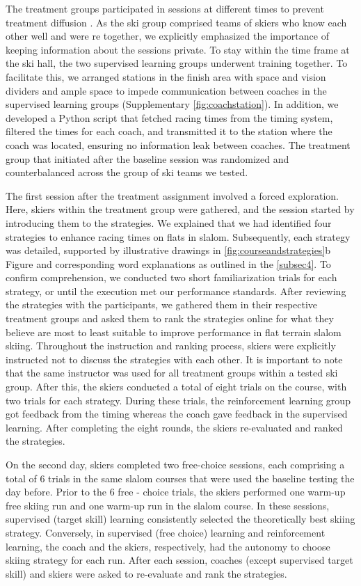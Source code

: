 \documentclass[pdflatex,sn-mathphys-num]{sn-jnl}%
\theoremstyle{thmstyleone}%
\theoremstyle{thmstyletwo}%
\theoremstyle{thmstylethree}%
\begin{document}
The treatment groups participated in sessions at different times to prevent treatment diffusion \cite{maxwell_designing_2017}. As the ski group comprised teams of skiers who know each other well and were re together, we explicitly emphasized the importance of keeping information about the sessions private. To stay within the time frame at the ski hall, the two supervised learning groups underwent training together. To facilitate this, we arranged stations in the finish area with space and vision dividers and ample space to impede communication between coaches in the supervised learning groups (Supplementary \ref{fig:coachstation}). In addition, we developed a Python script that fetched racing times from the timing system, filtered the times for each coach, and transmitted it to the station where the coach was located, ensuring no information leak between coaches. The treatment group that initiated after the baseline session was randomized and counterbalanced across the group of ski teams we tested.

The first session after the treatment assignment involved a forced exploration. Here, skiers within the treatment group were gathered, and the session started by introducing them to the strategies. We explained that we had identified four strategies to enhance racing times on flats in slalom. Subsequently, each strategy was detailed, supported by illustrative drawings in \ref{fig:courseandstrategies}b Figure and corresponding word explanations as outlined in the \ref{subsec4}. To confirm comprehension, we conducted two short familiarization trials for each strategy, or until the execution met our performance standards. After reviewing the strategies with the participants, we gathered them in their respective treatment groups and asked them to rank the strategies online for what they believe are most to least suitable to improve performance in flat terrain slalom skiing. Throughout the instruction and ranking process, skiers were explicitly instructed not to discuss the strategies with each other. It is important to note that the same instructor was used for all treatment groups within a tested ski group. After this, the skiers conducted a total of eight trials on the course, with two trials for each strategy. During these trials, the reinforcement learning group got feedback from the timing whereas the coach gave feedback in the supervised learning. After completing the eight rounds, the skiers re-evaluated and ranked the strategies.

On the second day, skiers completed two free-choice sessions, each comprising a total of 6 trials in the same slalom courses that were used the baseline testing the day before. Prior to the 6 free - choice trials, the skiers performed one warm-up free skiing run and one warm-up run in the slalom course. In these sessions, supervised (target skill) learning consistently selected the theoretically best skiing strategy. Conversely, in supervised (free choice) learning and reinforcement learning, the coach and the skiers, respectively, had the autonomy to choose skiing strategy for each run. After each session, coaches (except supervised target skill) and skiers were asked to re-evaluate and rank the strategies.
\end{document}
